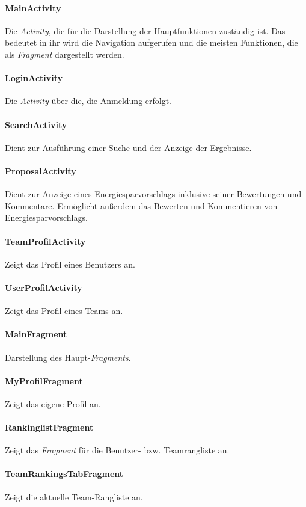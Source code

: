 \paragraph{MainActivity} Die \emph{Activity}, die für die Darstellung der Hauptfunktionen zuständig ist. Das bedeutet in ihr wird die Navigation aufgerufen und die meisten Funktionen, die als \emph{Fragment} dargestellt werden.
\paragraph{LoginActivity} Die \emph{Activity} über die, die Anmeldung erfolgt.
\paragraph{SearchActivity} Dient zur Ausführung einer Suche und der Anzeige der Ergebnisse.
\paragraph{ProposalActivity} Dient zur Anzeige eines Energiesparvorschlags inklusive seiner Bewertungen und Kommentare. Ermöglicht außerdem das Bewerten und Kommentieren von Energiesparvorschlags.
\paragraph{TeamProfilActivity} Zeigt das Profil eines Benutzers an.
\paragraph{UserProfilActivity} Zeigt das Profil eines Teams an.
\paragraph{MainFragment} Darstellung des Haupt-\emph{Fragments}.
\paragraph{MyProfilFragment} Zeigt das eigene Profil an.
\paragraph{RankinglistFragment} Zeigt das \emph{Fragment} für die Benutzer- bzw. Teamrangliste an.
\paragraph{TeamRankingsTabFragment} Zeigt die aktuelle Team-Rangliste an.
